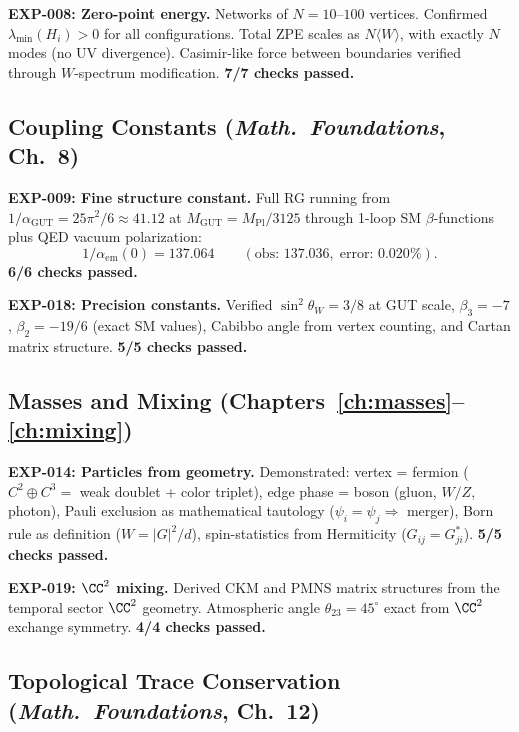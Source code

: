 \textbf{EXP-008: Zero-point energy.} Networks of $N = 10$--$100$ vertices. Confirmed $\lambda_\text{min}(H_i) > 0$ for all configurations. Total ZPE scales as $N\langle W\rangle$, with exactly $N$ modes (no UV divergence). Casimir-like force between boundaries verified through $W$-spectrum modification. \textbf{7/7 checks passed.}

\subsection{Coupling Constants (\textit{Math.~Foundations}, Ch.~8)}

\textbf{EXP-009: Fine structure constant.} Full RG running from $1/\alpha_\text{GUT} = 25\pi^2/6 \approx 41.12$ at $M_\text{GUT} = M_\text{Pl}/3125$ through 1-loop SM $\beta$-functions plus QED vacuum polarization:
\begin{equation}
1/\alpha_\text{em}(0) = 137.064 \qquad (\text{obs: } 137.036,\;\text{error: } 0.020\%).
\end{equation}
\textbf{6/6 checks passed.}

\textbf{EXP-018: Precision constants.} Verified $\sin^2\theta_W = 3/8$ at GUT scale, $\beta_3 = -7$, $\beta_2 = -19/6$ (exact SM values), Cabibbo angle from vertex counting, and Cartan matrix structure. \textbf{5/5 checks passed.}

\subsection{Masses and Mixing (Chapters~\ref{ch:masses}--\ref{ch:mixing})}

\textbf{EXP-014: Particles from geometry.} Demonstrated: vertex = fermion ($C^2 \oplus C^3 =$ weak doublet + color triplet), edge phase = boson (gluon, $W/Z$, photon), Pauli exclusion as mathematical tautology ($\psi_i = \psi_j \Rightarrow$ merger), Born rule as definition ($W = |G|^2/d$), spin-statistics from Hermiticity ($G_{ij} = G_{ji}^*$). \textbf{5/5 checks passed.}

\textbf{EXP-019: $\CC^2$ mixing.} Derived CKM and PMNS matrix structures from the temporal sector $\CC^2$ geometry. Atmospheric angle $\theta_{23} = 45^\circ$ exact from $\CC^2$ exchange symmetry. \textbf{4/4 checks passed.}

\subsection{Topological Trace Conservation (\textit{Math.~Foundations}, Ch.~12)}


